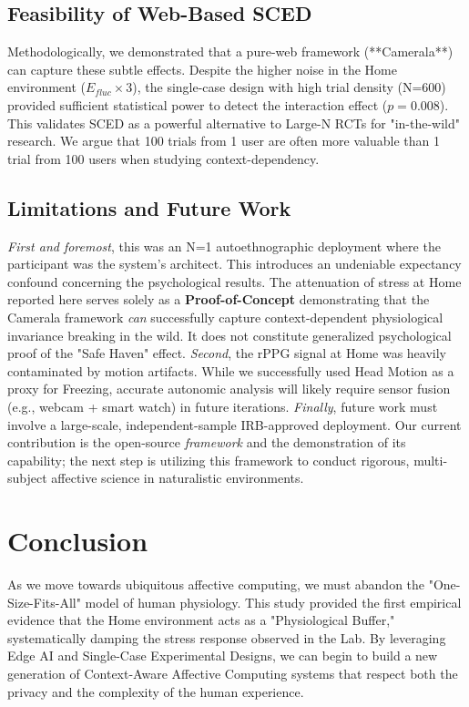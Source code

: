 \documentclass[journal]{IEEEtran}
\begin{document}
\subsection{Feasibility of Web-Based SCED}
Methodologically, we demonstrated that a pure-web framework (**Camerala**) can capture these subtle effects.
Despite the higher noise in the Home environment ($E_{fluc} \times 3$), the single-case design with high trial density (N=600) 
provided sufficient statistical power to detect the interaction effect ($p=0.008$).
This validates SCED as a powerful alternative to Large-N RCTs for "in-the-wild" research. 
We argue that 100 trials from 1 user are often more valuable than 1 trial from 100 users when studying context-dependency.

\subsection{Limitations and Future Work}
\textit{First and foremost}, this was an N=1 autoethnographic deployment where the participant was the system's architect. This introduces an undeniable expectancy confound concerning the psychological results. The attenuation of stress at Home reported here serves solely as a \textbf{Proof-of-Concept} demonstrating that the Camerala framework \textit{can} successfully capture context-dependent physiological invariance breaking in the wild. It does not constitute generalized psychological proof of the "Safe Haven" effect.
\textit{Second}, the rPPG signal at Home was heavily contaminated by motion artifacts. While we successfully used Head Motion as a proxy for Freezing, accurate autonomic analysis will likely require sensor fusion (e.g., webcam + smart watch) in future iterations.
\textit{Finally}, future work must involve a large-scale, independent-sample IRB-approved deployment. Our current contribution is the open-source \textit{framework} and the demonstration of its capability; the next step is utilizing this framework to conduct rigorous, multi-subject affective science in naturalistic environments.

\section{Conclusion}
As we move towards ubiquitous affective computing, we must abandon the "One-Size-Fits-All" model of human physiology. 
This study provided the first empirical evidence that the Home environment acts as a "Physiological Buffer," systematically damping the stress response 
observed in the Lab. By leveraging Edge AI and Single-Case Experimental Designs, we can begin to build a new generation of 
Context-Aware Affective Computing systems that respect both the privacy and the complexity of the human experience.
\end{document}
